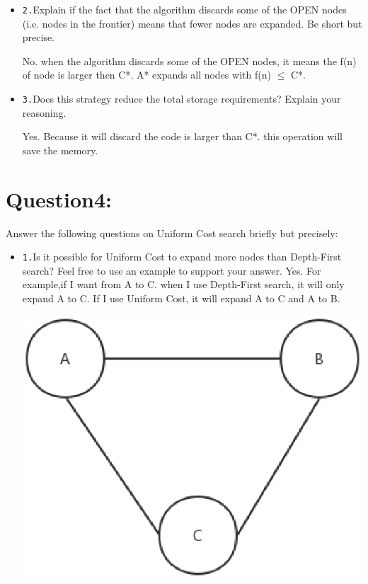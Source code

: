 \documentclass{article}
\begin{document}
\begin{itemize}
    \item \texttt{2.}Explain if the fact that the algorithm discards some of the OPEN nodes (i.e. nodes in the frontier) means that fewer nodes are expanded. Be short but precise.
    
    No. when the algorithm discards some of the OPEN nodes, it means the f(n) of node is larger
    then C*. A* expands all nodes with f(n) $\leq$ C*.
    

\end{itemize}

\begin{itemize}
    \item \texttt{3.}Does this strategy reduce the total storage requirements? Explain your reasoning.
    
    Yes. Because it will discard the code is larger than C*. this operation will save the memory.

\end{itemize}





\section{Question4:}
Answer the following questions on Uniform Cost search briefly but precisely:

\begin{itemize}
	\item \texttt{1.}Is it possible for Uniform Cost to expand more nodes than Depth-First search? Feel free to use an example to support your answer.\newline
    Yes. For example,if I want from A to C. when I use Depth-First search, it will only expand A to C. If I use Uniform Cost, it will expand A to C and A to B.
    \begin{center}
        \includegraphics[scale=0.5]{1}
    \end{center}
\end{itemize}
\end{document}
